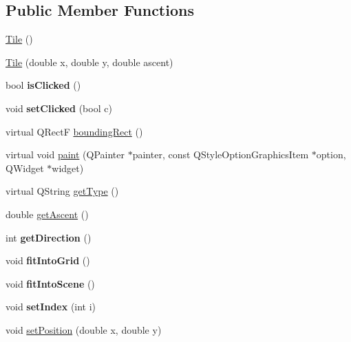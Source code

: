 \subsection*{Public Member Functions}
\begin{DoxyCompactItemize}
\item 
\mbox{\hyperlink{class_tile_aeeb5593bb6b75aae2edfcccbc84ab378}{Tile}} ()
\item 
\mbox{\hyperlink{class_tile_a337c665729b9bc64eadcbf95623d5f89}{Tile}} (double x, double y, double ascent)
\item 
\mbox{\label{class_tile_aaf4a05ad96a6889c3bb57c1cf08a329f}} 
bool {\bfseries is\+Clicked} ()
\item 
\mbox{\label{class_tile_a533f76209d1ca3901b5898396332b70d}} 
void {\bfseries set\+Clicked} (bool c)
\item 
virtual Q\+RectF \mbox{\hyperlink{class_tile_a3ffc5a081e722e910f14053fcfb7b00f}{bounding\+Rect}} ()
\item 
virtual void \mbox{\hyperlink{class_tile_ab0a7262b6fab842a7a467fcb2f7592eb}{paint}} (Q\+Painter $\ast$painter, const Q\+Style\+Option\+Graphics\+Item $\ast$option, Q\+Widget $\ast$widget)
\item 
virtual Q\+String \mbox{\hyperlink{class_tile_ad1dbea94d96060491a2dc4c7b92b31ab}{get\+Type}} ()
\item 
double \mbox{\hyperlink{class_tile_a95d921c5d074181603edb6e2e8dd5389}{get\+Ascent}} ()
\item 
\mbox{\label{class_tile_af8d69a6c278d2b8636aa23f88e47e2b0}} 
int {\bfseries get\+Direction} ()
\item 
\mbox{\label{class_tile_a0cd2136e09f22b4085769cd0a0b1389f}} 
void {\bfseries fit\+Into\+Grid} ()
\item 
\mbox{\label{class_tile_af2f7be553412c7bc9f0b6dade741a17f}} 
void {\bfseries fit\+Into\+Scene} ()
\item 
\mbox{\label{class_tile_a44a8d80edfae3c7d4f47c61035984b3c}} 
void {\bfseries set\+Index} (int i)
\item 
void \mbox{\hyperlink{class_tile_a80d6dd0d052f39c01f8f261dfe53f08b}{set\+Position}} (double x, double y)
\item 

\end{DoxyCompactItemize}
